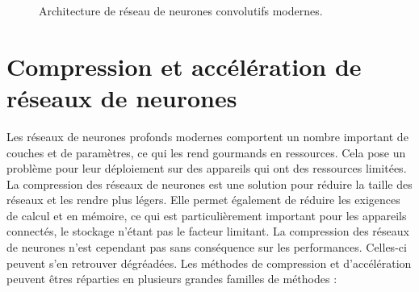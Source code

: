 \begin{figure}
  \centering
  \hspace{0.05\textwidth}
  \caption{Architecture de réseau de neurones convolutifs modernes.}
\end{figure}


\section*{Compression et accélération de réseaux de neurones}

Les réseaux de neurones profonds modernes comportent un nombre important de
couches et de paramètres, ce qui les rend gourmands en ressources. Cela pose un
problème pour leur déploiement sur des appareils qui ont des ressources
limitées. La compression des réseaux de neurones est une solution pour réduire
la taille des réseaux et les rendre plus légers. Elle permet également de
réduire les exigences de calcul et en mémoire, ce qui est particulièrement
important pour les appareils connectés, le stockage n'étant pas le facteur
limitant. La compression des réseaux de neurones n'est cependant pas sans
conséquence sur les performances. Celles-ci peuvent s'en retrouver dégréadées.
Les méthodes de compression et d'accélération peuvent êtres réparties en
plusieurs grandes familles de méthodes :\\

